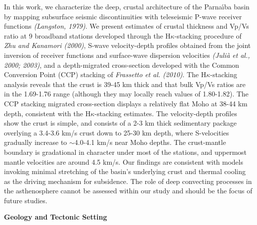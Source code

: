 \documentclass[manuscript,11pt]{geophysics}
\begin{document}
In this work, we characterize the deep, crustal architecture of the Parna\'{\i}ba basin by mapping subsurface seismic discontinuities with teleseismic P-wave receiver functions \textit{(Langston, 1979)}. We present estimates of crustal thickness and Vp/Vs ratio at 9 broadband stations developed through the H$\kappa$-stacking procedure of \textit{Zhu and Kanamori (2000)}, S-wave velocity-depth profiles obtained from the joint inversion of receiver functions and surface-wave dispersion velocities \textit{(Juli\`a et al., 2000; 2003)}, and a depth-migrated cross-section developed with the Common Conversion Point (CCP) stacking of \textit{Frassetto et al. (2010)}. The H$\kappa$-stacking analysis reveals that the crust is 39-45 km thick and that bulk Vp/Vs ratios are in the 1.69-1.76 range (although they may locally reach values of 1.80-1.82). The CCP stacking migrated cross-section displays a relatively flat Moho at 38-44 km depth, consistent with the H$\kappa$-stacking estimates. The velocity-depth profiles show the crust is simple, and consists of a 2-3 km thick sedimentary package overlying a 3.4-3.6 km/s crust down to 25-30 km depth, where S-velocities gradually increase to $\sim$4.0-4.1 km/s near Moho depths. The crust-mantle boundary is gradational in character under most of the stations, and uppermost mantle velocities are around 4.5 km/s. Our findings are consistent with models invoking minimal stretching of the basin's underlying crust and thermal cooling as the driving mechanism for subsidence. The role of deep convecting processes in the asthenosphere cannot be assessed within our study and should be the focus of future studies.

\begin{flushleft}
\textbf{\LARGE Geology and Tectonic Setting}
\end{flushleft}
\end{document}
